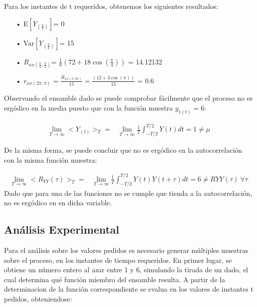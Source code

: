 Para los instantes de t requeridos, obtenemos los siguientes resultados:
\begin{enumerate}
	\item[•]E$\left[ Y_{(\frac{\pi}{2})}\right]$= 0 
	\item[•]Var$\left[Y_{(\frac{\pi}{2})}\right]$= 15
	\item[•]$R_{xx(\frac{\pi}{4},\frac{\pi}{2})}$= $\frac{1}{6} (72 + 18 \cos(\frac{\pi}{4}))$ = 14.12132
	\item[•]$r_{xx(2\pi,\pi)} = \frac{R_{xx(\pi,2\pi)}}{15} = \frac{ (12 + 3 \cos(\pi))}{15}$ = 0.6 \\
\end{enumerate}

Observando el ensamble dado se puede comprobar fácilmente que el proceso no es ergódico en la media puesto que con la función muestra $y_{1(t)} = 6$:

\begin{equation*}
\begin{split}
	\lim_{T\to\infty} < Y_{(t)} >_T = & \lim_{T\to\infty} \frac{1}{T} \int_{-T/2}^{T/2} Y(t) dt = 1 \neq \mu 
\end{split}
\end{equation*}

De la misma forma, se puede concluir que no es ergódico en la autocorrelación con la misma función muestra:

\begin{equation*}
\begin{split}
	\lim_{T\to\infty} < R_{YY}(\tau) >_T = & \lim_{T\to\infty} \frac{1}{T} \int_{-T/2}^{T/2} Y(t) Y(t + \tau) dt = 6 \neq R{YY}(\tau) \ 	\forall \tau
\end{split}	
\end{equation*}
Dado que para una de las funciones no se cumple que tienda a la autocorrelación, no es ergódico en en dicha variable.\\


\subsection{Análisis Experimental}

Para el análisis sobre los valores pedidos es necesario generar múltiples muestras sobre el proceso, en los instantes de tiempo requeridos. En primer lugar, se obtiene un número entero al azar entre 1 y 6, simulando la tirada de un dado, el cual determina qué función miembro del ensamble resulta.
A partir de la determinacion de la función correspondiente se evalua en los valores de instantes t pedidos, obteniendose:

